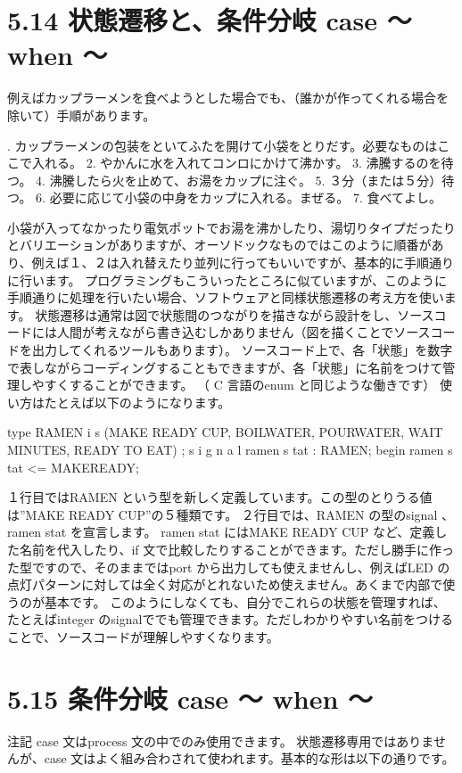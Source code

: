 \documentclass[letterpaper,10pt,dvipdfmx]{sphinxmanual}
\begin{document}
\section{5.14 状態遷移と、条件分岐 case ～ when ～}
\label{05_try:case-when}
例えばカップラーメンを食べようとした場合でも、（誰かが作ってくれる場合を除いて）手順があります。

. カップラーメンの包装をといてふたを開けて小袋をとりだす。必要なものはここで入れる。
2. やかんに水を入れてコンロにかけて沸かす。
3. 沸騰するのを待つ。
4. 沸騰したら火を止めて、お湯をカップに注ぐ。
5. ３分（または５分）待つ。
6. 必要に応じて小袋の中身をカップに入れる。まぜる。
7. 食べてよし。

小袋が入ってなかったり電気ポットでお湯を沸かしたり、湯切りタイプだったりとバリエーションがありますが、オーソドックなものではこのように順番があり、例えば１、２は入れ替えたり並列に行ってもいいですが、基本的に手順通りに行います。
プログラミングもこういったところに似ていますが、このように手順通りに処理を行いたい場合、ソフトウェアと同様状態遷移の考え方を使います。
状態遷移は通常は図で状態間のつながりを描きながら設計をし、ソースコードには人間が考えながら書き込むしかありません（図を描くことでソースコードを出力してくれるツールもあります）。
ソースコード上で、各「状態」を数字で表しながらコーディングすることもできますが、各「状態」に名前をつけて管理しやすくすることができます。
（ C 言語のenum と同じような働きです）
使い方はたとえば以下のようになります。

type RAMEN i s (MAKE READY CUP, BOILWATER, POURWATER, WAIT MINUTES,
READY TO EAT) ;
s i g n a l ramen s tat : RAMEN;
begin
ramen s tat \textless{}= MAKEREADY;

１行目ではRAMEN という型を新しく定義しています。この型のとりうる値は''MAKE READY CUP''の５種類です。
２行目では、RAMEN の型のsignal 、ramen stat を宣言します。
ramen stat にはMAKE READY CUP など、定義した名前を代入したり、if 文で比較したりすることができます。ただし勝手に作った型ですので、そのままではport から出力しても使えませんし、例えばLED の点灯パターンに対しては全く対応がとれないため使えません。あくまで内部で使うのが基本です。
このようにしなくても、自分でこれらの状態を管理すれば、たとえばinteger のsignalででも管理できます。ただしわかりやすい名前をつけることで、ソースコードが理解しやすくなります。


\section{5.15 条件分岐 case ～ when ～}
\label{05_try:id23}
注記
case 文はprocess 文の中でのみ使用できます。
状態遷移専用ではありませんが、case 文はよく組み合わされて使われます。基本的な形は以下の通りです。
\end{document}
